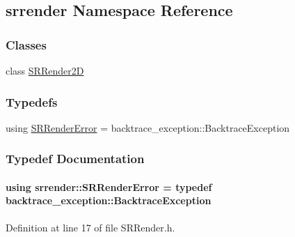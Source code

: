 \hypertarget{namespacesrrender}{}\subsection{srrender Namespace Reference}
\label{namespacesrrender}
\subsubsection*{Classes}
\begin{DoxyCompactItemize}
\item 
class \hyperlink{classsrrender_1_1SRRender2D}{S\+R\+Render2D}
\end{DoxyCompactItemize}
\subsubsection*{Typedefs}
\begin{DoxyCompactItemize}
\item 
using \hyperlink{namespacesrrender_a9a142db9660e71c105d0ea15f96ff6b2}{S\+R\+Render\+Error} = backtrace\+\_\+exception\+::\+Backtrace\+Exception
\end{DoxyCompactItemize}


\subsubsection{Typedef Documentation}
\paragraph[{\texorpdfstring{S\+R\+Render\+Error}{SRRenderError}}]{\setlength{\rightskip}{0pt plus 5cm}using {\bf srrender\+::\+S\+R\+Render\+Error} = typedef backtrace\+\_\+exception\+::\+Backtrace\+Exception}\hypertarget{namespacesrrender_a9a142db9660e71c105d0ea15f96ff6b2}{}\label{namespacesrrender_a9a142db9660e71c105d0ea15f96ff6b2}


Definition at line 17 of file S\+R\+Render.\+h.

